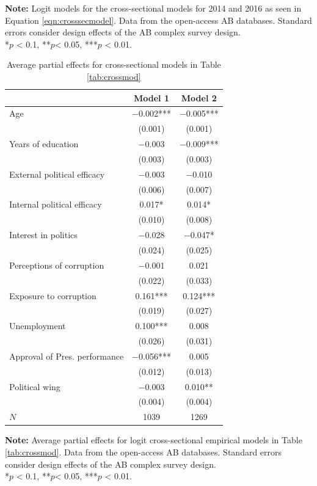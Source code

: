 \documentclass[12pt,a4]{article}\usepackage[]{graphicx}\usepackage[]{xcolor}
\begin{document}
\begin{table}[htbp]
\begin{center}
\end{center}
\textbf{Note:} Logit models for the cross-sectional models for 2014 and 2016 as seen in Equation \ref{eqn:crosssecmodel}. Data from the open-access AB databases. Standard errors consider design effects of the AB complex survey design.\\
*$p$ < 0.1, **$p$< 0.05, ***$p$ < 0.01.
\end{table}

\begin{table}[htbp]
\begin{center}
\caption{Average partial effects for cross-sectional models in Table \ref{tab:crossmod}}
\label{tab:apecross}

\begin{tabular}[t]{lcc}
\toprule
  & Model 1 & Model 2\\
\midrule
Age & \num{-0.002}*** & \num{-0.005}***\\
 & (\num{0.001}) & (\num{0.001})\\
Years of education & \num{-0.003} & \num{-0.009}***\\
 & (\num{0.003}) & (\num{0.003})\\
External political efficacy & \num{-0.003} & \num{-0.010}\\
 & (\num{0.006}) & (\num{0.007})\\
Internal political efficacy & \num{0.017}* & \num{0.014}*\\
 & (\num{0.010}) & (\num{0.008})\\
Interest in politics & \num{-0.028} & \num{-0.047}*\\
 & (\num{0.024}) & (\num{0.025})\\
Perceptions of corruption & \num{-0.001} & \num{0.021}\\
 & (\num{0.022}) & (\num{0.033})\\
Exposure to corruption & \num{0.161}*** & \num{0.124}***\\
 & (\num{0.019}) & (\num{0.027})\\
Unemployment & \num{0.100}*** & \num{0.008}\\
 & (\num{0.026}) & (\num{0.031})\\
Approval of Pres. performance & \num{-0.056}*** & \num{0.005}\\
 & (\num{0.012}) & (\num{0.013})\\
Political wing & \num{-0.003} & \num{0.010}**\\
 & (\num{0.004}) & (\num{0.004})\\
\midrule
$N$ & \num{1039} & \num{1269}\\
\bottomrule
\end{tabular}


\end{center}
\textbf{Note:} Average partial effects for logit cross-sectional empirical models in Table \ref{tab:crossmod}. Data from the open-access AB databases. Standard errors consider design effects of the AB complex survey design.\\
*$p$ < 0.1, **$p$< 0.05, ***$p$ < 0.01.
\end{table}
\end{document}
